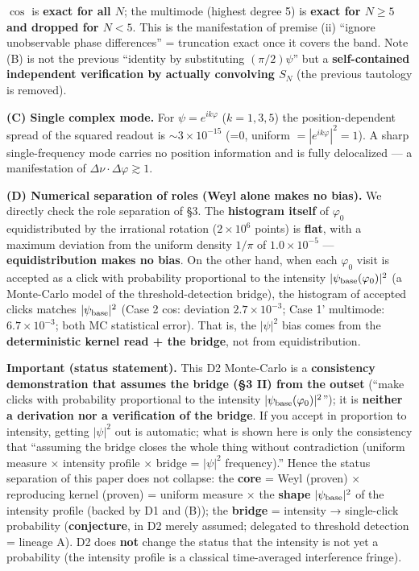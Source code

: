 \documentclass[
]{ltjsarticle}
\begin{document}
\(\cos\) is \textbf{exact for all \(N\)}; the multimode (highest degree
5) is \textbf{exact for \(N\ge5\) and dropped for \(N<5\)}. This is the
manifestation of premise (ii) ``ignore unobservable phase differences''
= truncation exact once it covers the band. Note (B) is not the previous
``identity by substituting \((\pi/2)\psi\)'' but a
\textbf{self-contained independent verification by actually convolving
\(S_N\)} (the previous tautology is removed).

\textbf{(C) Single complex mode.} For \(\psi=e^{ik\varphi}\)
(\(k=1,3,5\)) the position-dependent spread of the squared readout is
\(\sim3\times10^{-15}\) (=0, uniform \(=|e^{ik\varphi}|^2=1\)). A sharp
single-frequency mode carries no position information and is fully
delocalized --- a manifestation of
\(\Delta\nu\cdot\Delta\varphi\gtrsim1\).

\textbf{(D) Numerical separation of roles (Weyl alone makes no bias).}
We directly check the role separation of §3. The \textbf{histogram
itself} of \(\varphi_0\) equidistributed by the irrational rotation
(\(2\times10^6\) points) is \textbf{flat}, with a maximum deviation from
the uniform density \(1/\pi\) of \(1.0\times10^{-5}\) ---
\textbf{equidistribution makes no bias}. On the other hand, when each
\(\varphi_0\) visit is accepted as a click with probability proportional
to the intensity \(|\psi_{\rm base}(\varphi_0)|^2\) (a Monte-Carlo model
of the threshold-detection bridge), the histogram of accepted clicks
matches \(|\psi_{\rm base}|^2\) (Case 2 cos: deviation
\(2.7\times10^{-3}\); Case 1' multimode: \(6.7\times10^{-3}\); both MC
statistical error). That is, the \(|\psi|^2\) bias comes from the
\textbf{deterministic kernel read + the bridge}, not from
equidistribution.

\textbf{Important (status statement).} This D2 Monte-Carlo is a
\textbf{consistency demonstration that assumes the bridge (§3 II) from
the outset} (``make clicks with probability proportional to the
intensity \(|\psi_{\rm base}(\varphi_0)|^2\)''); it is \textbf{neither a
derivation nor a verification of the bridge}. If you accept in
proportion to intensity, getting \(|\psi|^2\) out is automatic; what is
shown here is only the consistency that ``assuming the bridge closes the
whole thing without contradiction (uniform measure × intensity profile ×
bridge = \(|\psi|^2\) frequency).'' Hence the status separation of this
paper does not collapse: the \textbf{core} = Weyl (proven) × reproducing
kernel (proven) = uniform measure × the \textbf{shape}
\(|\psi_{\rm base}|^2\) of the intensity profile (backed by D1 and (B));
the \textbf{bridge} = intensity → single-click probability
(\textbf{conjecture}, in D2 merely assumed; delegated to threshold
detection = lineage A). D2 does \textbf{not} change the status that the
intensity is not yet a probability (the intensity profile is a classical
time-averaged interference fringe).
\end{document}
